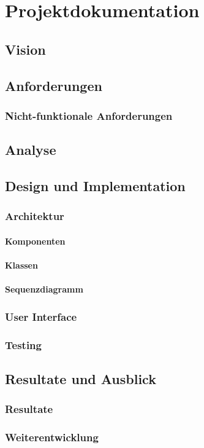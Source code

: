 \part{Projektdokumentation}

\chapter{Vision}

\chapter{Anforderungen}



\section{Nicht-funktionale Anforderungen}


\chapter{Analyse}


\chapter{Design und Implementation}


\section{Architektur}

\subsection{Komponenten}


\subsection{Klassen}


\subsection{Sequenzdiagramm}



\section{User Interface}




\section{Testing}


\chapter{Resultate und Ausblick}

\section{Resultate}


\section{Weiterentwicklung}


